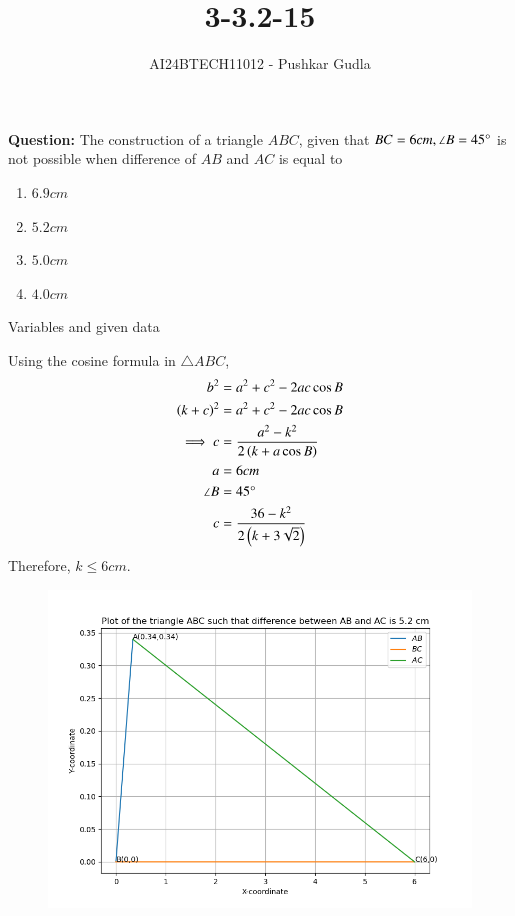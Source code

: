\documentclass[journal]{IEEEtran}
\begin{document}

\vspace{3cm}

\title{3-3.2-15}
\author{AI24BTECH11012 - Pushkar Gudla}
{\let\newpage\relax\maketitle}

\renewcommand{\thefigure}{\theenumi}
\renewcommand{\thetable}{\theenumi}
\setlength{\intextsep}{10pt} %


\renewcommand{\thetable}{\theenumi}
\textbf{Question:} The construction of a triangle $ABC$, given that $BC=6cm, \angle B=45\degree$ is not possible when difference of $AB$ and $AC$ is equal to\begin{enumerate}
	\item $6.9cm$
	\item $5.2cm$
	\item $5.0cm$
	\item $4.0cm$
\end{enumerate}
\solution
\begin{table}[h!]    
  \centering
  
  \caption{Variables and given data}
  \label{tab 3.2.15}
\end{table}
Using the cosine formula in $\triangle ABC$,\\
\begin{align}
	b^2 &= a^2 + c^2 - 2ac\cos B \\
	\left(k+c\right)^2 &= a^2 + c^2 - 2ac\cos B \\
	\implies c &= \frac{a^2 - k^2}{2\left(k + a\cos B\right)}\\
	a &= 6cm \\
	\angle B &= 45\degree \\
	c &= \frac{36-k^2}{2\left(k + 3\sqrt{2}\right)}\\	
\end{align}
Therefore, $k \leq 6cm $.
\begin{figure}[h]
	\centering
	\includegraphics[scale=0.5]{figs/plot1.png}
	\label{Fig}
\end{figure}
\end{document}
